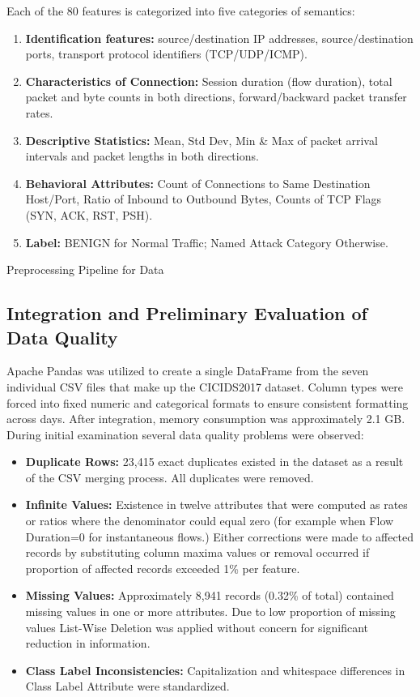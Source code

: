 Each of the 80 features is categorized into five categories of semantics:
\begin{enumerate}
\item \textbf{Identification features:} source/destination IP addresses, source/destination ports, transport protocol identifiers (TCP/UDP/ICMP).
\item \textbf{Characteristics of Connection:} Session duration (flow duration), total packet and byte counts in both directions, forward/backward packet transfer rates.
\item \textbf{Descriptive Statistics:} Mean, Std Dev, Min \& Max of packet arrival intervals and packet lengths in both directions.
\item \textbf{Behavioral Attributes:} Count of Connections to Same Destination Host/Port, Ratio of Inbound to Outbound Bytes, Counts of TCP Flags (SYN, ACK, RST, PSH).
\item \textbf{Label:} BENIGN for Normal Traffic; Named Attack Category Otherwise.
\end{enumerate}

Preprocessing Pipeline for Data

\subsection{Integration and Preliminary Evaluation of Data Quality }

Apache Pandas was utilized to create a single DataFrame from the seven individual CSV files that make up the CICIDS2017 dataset. Column types were forced into fixed numeric and categorical formats to ensure consistent formatting across days. After integration, memory consumption was approximately 2.1 GB. During initial examination several data quality problems were observed:
\begin{itemize}
\item \textbf{Duplicate Rows:} 23,415 exact duplicates existed in the dataset as a result of the CSV merging process. All duplicates were removed.
\item \textbf{Infinite Values:} Existence in twelve attributes that were computed as rates or ratios where the denominator could equal zero (for example when Flow Duration=0 for instantaneous flows.) Either corrections were made to affected records by substituting column maxima values or removal occurred if proportion of affected records exceeded 1\% per feature.
\item \textbf{Missing Values:} Approximately 8,941 records (0.32\% of total) contained missing values in one or more attributes. Due to low proportion of missing values List-Wise Deletion was applied without concern for significant reduction in information.
\item \textbf{Class Label Inconsistencies:} Capitalization and whitespace differences in Class Label Attribute were standardized.
\end{itemize}

